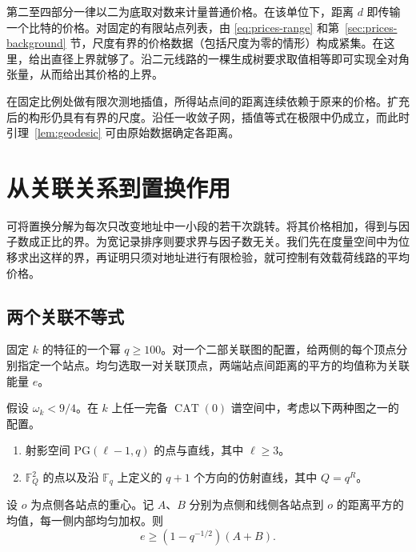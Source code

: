 第二至四部分一律以二为底取对数来计量普通价格。在该单位下，距离 $d$ 即传输一个比特的价格。对固定的有限站点列表，由 \eqref{eq:prices-range} 和第~\ref{sec:prices-background} 节，尺度有界的价格数据（包括尺度为零的情形）构成紧集。在这里，给出直径上界就够了。沿二元线路的一棵生成树要求取值相等即可实现全对角张量，从而给出其价格的上界。

在固定比例处做有限次测地插值，所得站点间的距离连续依赖于原来的价格。扩充后的构形仍具有有界的尺度。沿任一收敛子网，插值等式在极限中仍成立，而此时引理~\ref{lem:geodesic} 可由原始数据确定各距离。

\section{从关联关系到置换作用}\label{sec:sort-action}

可将置换分解为每次只改变地址中一小段的若干次跳转。将其价格相加，得到与因子数成正比的界。为宽记录排序则要求界与因子数无关。我们先在度量空间中为位移求出这样的界，再证明只须对地址进行有限检验，就可控制有效载荷线路的平均价格。

\subsection{两个关联不等式}

固定 $k$ 的特征的一个幂 $q\ge100$。对一个二部关联图的配置，给两侧的每个顶点分别指定一个站点。均匀选取一对关联顶点，两端站点间距离的平方的均值称为关联能量 $e$。

\begin{lemma}\label{lem:sort-inc} 假设 $\omega_k<9/4$。在 $k$ 上任一完备 $\operatorname{CAT}(0)$ 谱空间中，考虑以下两种图之一的配置。\begin{enumerate} \item 射影空间 $\mathrm{PG}(\ell-1,q)$ 的点与直线，其中 $\ell\ge3$。\item $\mathbb F_Q^2$ 的点以及沿 $\mathbb F_q$ 上定义的 $q+1$ 个方向的仿射直线，其中 $Q=q^R$。\end{enumerate} 设 $o$ 为点侧各站点的重心。记 $A$、$B$ 分别为点侧和线侧各站点到 $o$ 的距离平方的均值，每一侧内部均匀加权。则 \[
                 e\ge (1-q^{-1/2})(A+B).
\] \end{lemma}


